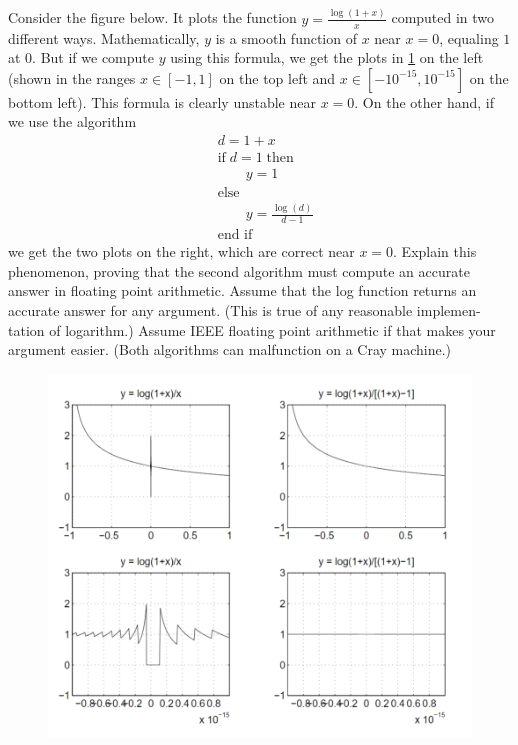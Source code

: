 \documentclass[a4paper]{ctexart}
\begin{document}
\subsection{}
Consider the figure below. 
It plots the function $y = \frac{\log (1 + x)}{x}$ computed in two different ways.
Mathematically, $y$ is a smooth function of $x$ near $x = 0$, equaling $1$ at $0$. But
if we compute $y$ using this formula, we get the plots in \cref{fig:1.9} on the left (shown in the
ranges $x \in [-1, 1]$ on the top left and $x \in [-10^{-15}, 10^{-15}]$ on the bottom left).
This formula is clearly unstable near $x = 0$. On the other hand, if we use the
algorithm
\begin{align*}
    &d=1+x\\
    &\text{if} \;d=1 \;\text{then}\\
    &\quad\quad y=1\\
    &\text{else}\\
    &\quad\quad y=\frac{\log(d)}{d-1}\\
    &\text{end if}
\end{align*}
we get the two plots on the right, which are correct near $x = 0$. Explain this
phenomenon, proving that the second algorithm must compute an accurate
answer in ﬂoating point arithmetic. Assume that the log function returns an
accurate answer for any argument. (This is true of any reasonable implemen-
tation of logarithm.) Assume IEEE ﬂoating point arithmetic if that makes
your argument easier. (Both algorithms can malfunction on a Cray machine.)
\begin{figure}[ht]
    \centering
    \includegraphics{figure/question1_9}
    \label{fig:1.9}
\end{figure}
\end{document}
